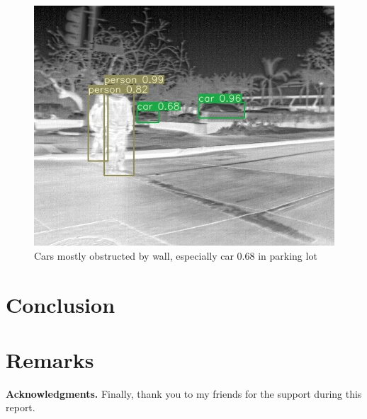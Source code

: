 \documentclass[oneside]{article}
\begin{document}
\begin{figure}
\centering
\includegraphics[width=0.7\linewidth]{images/results-f6}
\caption{Cars mostly obstructed by wall, especially car 0.68 in parking lot}
\label{fig:results-f6}
\end{figure}

\newpage
\section{Conclusion}

\section{Remarks}


\vspace{24pt} \noindent\textbf{Acknowledgments.}{\small \quad
Finally, thank you to my friends for the support during this report.
}




\small{}




\end{document}
